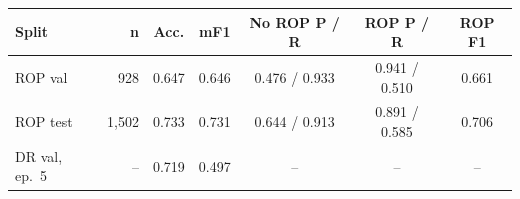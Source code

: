 \begin{tabular}{@{}>{\raggedright\arraybackslash}p{1.45cm}rccccc@{}}
\toprule
Split & n & Acc. & mF1 & No ROP P / R & ROP P / R & ROP F1\\
\midrule
ROP val & 928 & 0.647 & 0.646 & 0.476 / 0.933 & 0.941 / 0.510 & 0.661 \\
ROP test & 1{,}502 & 0.733 & 0.731 & 0.644 / 0.913 & 0.891 / 0.585 & 0.706 \\
DR val, ep.\ 5 & -- & 0.719 & 0.497 & -- & -- & -- \\
\bottomrule
\end{tabular}

